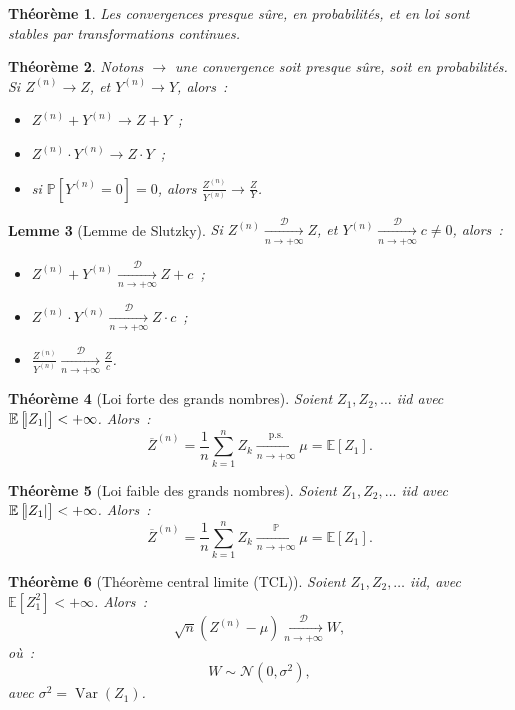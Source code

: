 \documentclass{report}
\DeclareMathOperator{\Var}{Var}
\renewcommand{\P}{\mathbb P}
\newcommand{\E}{\mathbb E}
\newcommand{\pinfty}{{+\infty}}
\newcommand{\cvgp}{\xrightarrow[n \to \pinfty]{\P}}
\newcommand{\cvgd}{\xrightarrow[n \to \pinfty]{\mathcal D}}
\newcommand{\cvgps}{\xrightarrow[n \to \pinfty]{\text{p.s.}}}
\newtheorem{thm}{Théorème}[chapter]
\newtheorem{lem}[thm]{Lemme}
\theoremstyle{definition}
\theoremstyle{remark}
\begin{document}
			\begin{thm} Les convergences presque sûre, en probabilités, et en loi sont stables par transformations continues.
			\end{thm}
			
			\begin{thm}\label{thm:propconvg} Notons $\to$ une convergence soit presque sûre, soit en probabilités. Si $Z^{(n)} \to Z$, et $Y^{(n)} \to Y$, alors~:
			\begin{itemize}
				\item[$(i)$]   $Z^{(n)} + Y^{(n)} \to Z+Y$~;
				\item[$(ii)$]  $Z^{(n)} \cdot Y^{(n)} \to Z \cdot Y$~;
				\item[$(iii)$] si $\P[Y^{(n)} = 0] = 0$, alors $\frac {Z^{(n)}}{Y^{(n)}} \to \frac ZY$.
			\end{itemize}
			\end{thm}
			
			\begin{lem}[Lemme de Slutzky] Si $Z^{(n)} \cvgd Z$, et $Y^{(n)} \cvgd c \neq 0$, alors~:
			\begin{itemize}
				\item[$(i)$]   $Z^{(n)} + Y^{(n)} \cvgd Z+c$~;
				\item[$(ii)$]  $Z^{(n)} \cdot Y^{(n)} \cvgd Z \cdot c$~;
				\item[$(iii)$] $\frac {Z^{(n)}}{Y^{(n)}} \cvgd \frac Zc$.
			\end{itemize}
			\end{lem}
			
			\begin{thm}[Loi forte des grands nombres] Soient $Z_1, Z_2, \ldots$ iid avec $\E\left[\abs {Z_1}\right] < \pinfty$. Alors~:
			\[\overline Z^{(n)} = \frac 1n\sum_{k=1}^nZ_k \cvgps \mu = \E[Z_1].\]
			\end{thm}
			
			\begin{thm}[Loi faible des grands nombres] Soient $Z_1, Z_2, \ldots$ iid avec $\E\left[\abs {Z_1}\right] < \pinfty$. Alors~:
			\[\overline Z^{(n)} = \frac 1n\sum_{k=1}^nZ_k \cvgp \mu = \E[Z_1].\]
			\end{thm}
			
			\begin{thm}[Théorème central limite (TCL)] Soient $Z_1, Z_2, \ldots$ iid, avec $\E[Z_1^2] < \pinfty$. Alors~:
			\[\sqrt n\left(Z^{(n)} - \mu\right) \cvgd W,\]
			où~:
			\[W \sim \mathcal N(0, \sigma^2),\]
			avec $\sigma^2 = \Var(Z_1)$.
			\end{thm}
		
\end{document}
